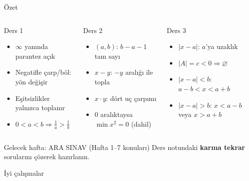 \documentclass[aspectratio=169,11pt,handout]{beamer}
\begin{document}
\begin{frame}{Özet}
\begin{columns}[t]
\begin{block}{Ders 1}
\small
\begin{itemize}
\item \(\infty\) yanında parantez açık
\item Negatifle çarp/böl: yön değişir
\item Eşitsizlikler yalnızca toplanır
\item \(0<a<b\Rightarrow \frac1a>\frac1b\)
\end{itemize}
\end{block}
\begin{block}{Ders 2}
\small
\begin{itemize}
\item \((a,b)\): \(b-a-1\) tam sayı
\item \(x-y\): \(-y\) aralığı ile topla
\item \(x\cdot y\): dört uç çarpımı
\item \(0\) aralıktaysa \(\min x^2=0\) (dahil)
\end{itemize}
\end{block}
\begin{block}{Ders 3}
\small
\begin{itemize}
\item \(|x-a|\): \(a\)'ya uzaklık
\item \(|A|=c<0\Rightarrow\varnothing\)
\item \(|x-a|<b\): \(a-b<x<a+b\)
\item \(|x-a|>b\): \(x<a-b\) veya \(x>a+b\)
\end{itemize}
\end{block}
\end{columns}
\vspace{2pt}
\begin{alertblock}{Gelecek hafta: ARA SINAV (Hafta 1--7 konuları)}
Ders notundaki \textbf{karma tekrar} sorularını çözerek hazırlanın.
\end{alertblock}
\end{frame}

\begin{frame}
\centering\Large İyi çalışmalar
\end{frame}
\end{document}
